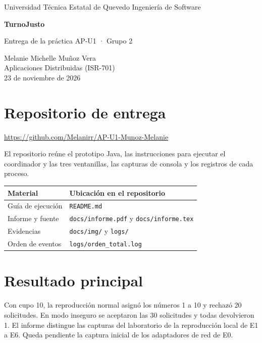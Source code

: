 \documentclass[11pt,a4paper]{article}
\begin{document}
\thispagestyle{empty}
{\small Universidad Técnica Estatal de Quevedo \quad Ingeniería de Software}\par
\vspace{12mm}
{\LARGE\bfseries TurnoJusto}\par
{\large Entrega de la práctica AP-U1 · Grupo 2}\par
\medskip
Melanie Michelle Muñoz Vera\\
Aplicaciones Distribuidas (ISR-701)\\
23 de noviembre de 2026
\bigskip

\section*{Repositorio de entrega}
\url{https://github.com/Melanirr/AP-U1-Munoz-Melanie}

El repositorio reúne el prototipo Java, las instrucciones para ejecutar el coordinador y las tres ventanillas, las capturas de consola y los registros de cada proceso.

\begin{tabularx}{\linewidth}{@{}lX@{}}
\toprule
Material & Ubicación en el repositorio\\ \midrule
Guía de ejecución & \texttt{README.md}\\
Informe y fuente & \texttt{docs/informe.pdf} y \texttt{docs/informe.tex}\\
Evidencias & \texttt{docs/img/} y \texttt{logs/}\\
Orden de eventos & \texttt{logs/orden\_total.log}\\
\bottomrule
\end{tabularx}

\section*{Resultado principal}
Con cupo 10, la reproducción normal asignó los números 1 a 10 y rechazó 20 solicitudes. En modo inseguro se aceptaron las 30 solicitudes y todas devolvieron 1. El informe distingue las capturas del laboratorio de la reproducción local de E1 a E6. Queda pendiente la captura inicial de los adaptadores de red de E0.
\end{document}
